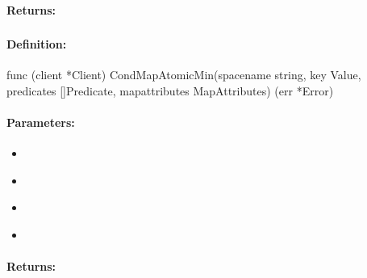 \paragraph{Returns:}


\pagebreak
\subsubsection{}
\label{api:Go:CondMapAtomicMin}


\paragraph{Definition:}
\begin{gocode}
func (client *Client) CondMapAtomicMin(spacename string, key Value, predicates []Predicate, mapattributes MapAttributes) (err *Error)
\end{gocode}

\paragraph{Parameters:}
\begin{itemize}[noitemsep]
\item {}\\

\item {}\\

\item {}\\

\item {}\\

\end{itemize}

\paragraph{Returns:}


\pagebreak
\subsubsection{}
\label{api:Go:GroupMapAtomicMin}



